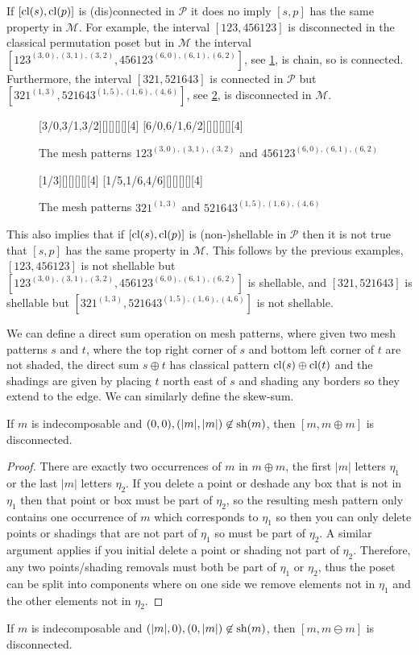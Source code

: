 \documentclass[11pt,a4paper,oneside]{article}
\begin{document}
If $[\operatorname{\textrm{cl}}(s),\operatorname{\textrm{cl}}(p)]$ is (dis)connected in $\mathcal{P}$ it does no imply $[s,p]$ has the same property in $\mathcal{M}$. For example, the interval $[123,456123]$ is disconnected in the classical permutation poset but in $\mathcal{M}$ the interval $[123^{(3,0),(3,1),(3,2)},456123^{(6,0),(6,1),(6,2)}]$, see \cref{fig:123}, is chain, so is connected. Furthermore, the interval $[321,521643]$ is connected in $\mathcal{P}$ but $[321^{(1, 3)},521643^{(1, 5), (1, 6), (4, 6)}]$, see \cref{fig:321}, is disconnected in $\mathcal{M}$.
\begin{figure}[h]\centering
{}[3/0,3/1,3/2][][][][][4]
[6/0,6/1,6/2][][][][][4]
\caption{The mesh patterns $123^{(3,0),(3,1),(3,2)}$ and $456123^{(6,0),(6,1),(6,2)}$}\label{fig:123}
\end{figure}
\begin{figure}[h]\centering
{}[1/3][][][][][4]
[1/5,1/6,4/6][][][][][4]
\caption{The mesh patterns $321^{(1, 3)}$ and $521643^{(1, 5), (1, 6), (4, 6)}$}\label{fig:321}
\end{figure}

This also implies that if $[\operatorname{\textrm{cl}}(s),\operatorname{\textrm{cl}}(p)]$ is (non-)shellable in $\mathcal{P}$ then it is not true that $[s,p]$ has the same property in $\mathcal{M}$. This follows by the previous examples, $[123,456123]$ is not shellable but $[123^{(3,0),(3,1),(3,2)},456123^{(6,0),(6,1),(6,2)}]$ is shellable, and $[321,521643]$ is shellable but $[321^{(1, 3)},521643^{(1, 5), (1, 6), (4, 6)}]$ is not shellable.

We can define a direct sum operation on mesh patterns, where given two mesh patterns $s$ and $t$, where the top right corner of $s$ and bottom left corner of $t$ are not shaded, the direct sum $s\oplus t$ has classical pattern $\operatorname{\textrm{cl}}(s)\oplus\operatorname{\textrm{cl}}(t)$ and the shadings are given by placing $t$ north east of $s$ and shading any borders so they extend to the edge. We can similarly define the skew-sum.

\begin{lem}
If $m$ is indecomposable and $(0,0),(|m|,|m|)\not\in\operatorname{\textrm{sh}}(m)$, then $[m,m\oplus m]$ is disconnected.
\begin{proof}
There are exactly two occurrences of $m$ in $m\oplus m$, the first $|m|$ letters $\eta_1$ or the last $|m|$ letters $\eta_2$. If you delete a point or deshade any box that is not in $\eta_1$ then that point or box must be part of $\eta_2$, so the resulting mesh pattern only contains one occurrence of $m$ which corresponds to $\eta_1$ so then you can only delete points or shadings that are not part of $\eta_1$ so must be part of $\eta_2$. A similar argument applies if you initial delete a point or shading not part of $\eta_2$. Therefore, any two points/shading removals must both be part of $\eta_1$ or $\eta_2$, thus the poset can be split into components where on one side we remove elements not in $\eta_1$ and the other elements not in $\eta_2$.
\end{proof}
\end{lem}
\begin{cor}
If $m$ is indecomposable and $(|m|,0),(0,|m|)\not\in\operatorname{\textrm{sh}}(m)$, then $[m,m\ominus m]$ is disconnected.
\end{cor}
\end{document}
